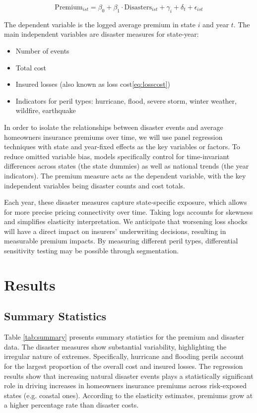 \documentclass[12pt]{article}
\begin{document}
\begin{equation} 
    \mathrm{Premium}_{ist} = \beta_0 + \beta_1 \cdot \mathrm{Disasters}_{ist} + \gamma_i + \delta_t + \epsilon_{ist}
\end{equation}

The dependent variable is the logged average premium in state $i$ and year $t$. The main independent variables are disaster measures 
for state-year:

\begin{itemize} 
    \item Number of events 
    \item Total cost 
    \item Insured losses (also known as loss cost\ref{eq:losscost})
    \item Indicators for peril types: hurricane, flood, severe storm, winter weather, wildfire, earthquake 
\end{itemize}


In order to isolate the relationships between disaster events and average homeowners insurance premiums over time, we will use 
panel regression techniques with state and year-fixed effects as the key variables or factors. To reduce omitted variable bias, 
models specifically control for time-invariant differences across states (the state dummies) as well as national trends (the year 
indicators). The premium measure acts as the dependent variable, with the key independent variables being disaster counts and 
cost totals.

Each year, these disaster measures capture state-specific exposure, which allows for more precise pricing connectivity over time. Taking logs 
accounts for skewness and simplifies elasticity interpretation. We anticipate that worsening loss shocks will have a direct impact on 
insurers' underwriting decisions, resulting in measurable premium impacts. By measuring different peril types, differential sensitivity testing 
may be possible through segmentation.


\section{Results}
\label{sec:resu}
\subsection{Summary Statistics}
Table \ref{tab:summary} presents summary statistics for the premium and disaster data. The disaster measures show substantial variability, 
highlighting the irregular nature of extremes. Specifically, hurricane and flooding perils account for the largest proportion of the overall cost and 
insured losses. The regression results show that increasing natural disaster events plays a statistically significant role in 
driving increases in homeowners insurance premiums across risk-exposed states (e.g. coastal ones). According to the elasticity estimates, premiums grow 
at a higher percentage rate than disaster costs.
\end{document}
